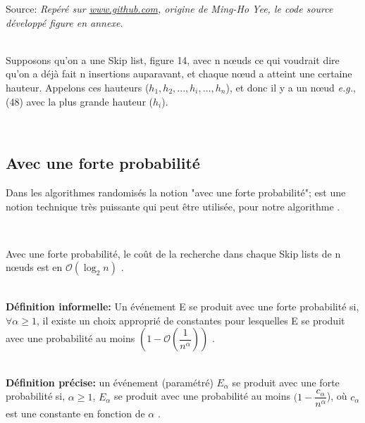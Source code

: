 \documentclass[hidelinks,a4paper,12pt]{article}
\begin{document}
\begin{center}
\caption*{ \small Source: \textit{Repéré sur  \href{https://github.com/mhyee/latex-examples/blob/master/skip_list.tex}{ www.github.com}, origine de Ming-Ho Yee, le code source développé figure en annexe.}}
\end{center}

~\\

Supposons qu'on a une Skip list, figure 14, avec n nœuds ce qui voudrait dire qu'on a déjà fait n insertions auparavant, et chaque nœud a atteint une certaine hauteur. Appelons ces hauteurs ($h_1, h_2, ... ,h_i, ..., h_n $), et donc il y a un nœud \textit{e.g.}, (48) avec la plus grande hauteur ($h_i$).

~\\

\subsection{Avec une forte probabilité}
Dans les algorithmes randomisés la notion "avec une forte probabilité"; est une notion technique très puissante qui peut être utilisée, pour notre algorithme \cite{ArticleDemaine}.

~\\

\begin{theorem}
	Avec une forte probabilité, le coût de la recherche dans chaque Skip lists de n nœuds est en $\mathcal{O}(\log_2 n) $ \cite{ArticleDemaine}.
\end{theorem}

~\\

\textbf {Définition informelle:}
Un événement E se produit avec une forte probabilité si, $\forall \alpha \ge 1$, il existe un  choix approprié de constantes pour lesquelles E se produit avec une probabilité au moins $(1- \mathcal{O}( \dfrac{1}{n^\alpha} ) )$ \cite{ArticleDemaine}.

~\\

\textbf {Définition précise:} un événement (paramétré) $E_\alpha$ se produit avec une forte probabilité si, $\alpha \ge 1 $, $E_\alpha$ se produit avec une probabilité au moins $(1 - \dfrac{c_\alpha}{n^\alpha}$), où $c_\alpha$ est une constante en fonction de $\alpha$ \cite{ArticleDemaine}. 
\end{document}
